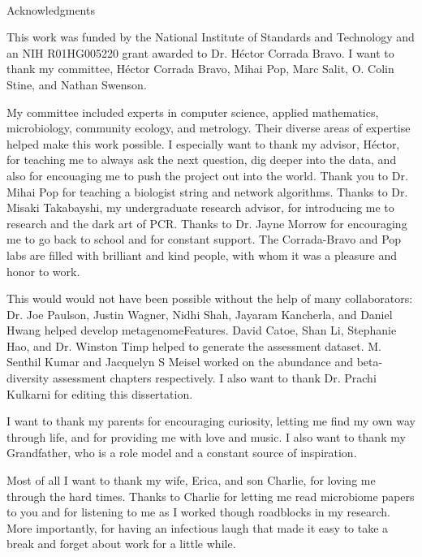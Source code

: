 
\renewcommand{\baselinestretch}{2}
\small\normalsize
\hbox{\ }

\vspace{-.65in}

\begin{center}
\large{Acknowledgments}
\end{center}

\vspace{1ex}


This work was funded by the National Institute of Standards and Technology and an NIH R01HG005220 grant awarded to Dr. Héctor Corrada Bravo.
I want to thank my committee, Héctor Corrada Bravo, Mihai Pop, Marc Salit, O. Colin Stine, and Nathan Swenson.  

My committee included experts in computer science, applied mathematics, microbiology, community ecology, and metrology.
Their diverse areas of expertise helped make this work possible.
I especially want to thank my advisor, Héctor, for teaching me to always ask the next question, dig deeper into the data, and also for encouaging me to push the project out into the world. 
Thank you to Dr. Mihai Pop for teaching a biologist string and network algorithms. 
Thanks to Dr. Misaki Takabayshi, my undergraduate research advisor, for introducing me to research and the dark art of PCR.
Thanks to Dr. Jayne Morrow for encouraging me to go back to school and for constant support.
The Corrada-Bravo and Pop labs are filled with brilliant and kind people, with whom it was a pleasure and honor to work.  

This would would not have been possible without the help of many collaborators: 
Dr. Joe Paulson, Justin Wagner, Nidhi Shah, Jayaram Kancherla, and Daniel Hwang helped develop metagenomeFeatures. 
David Catoe, Shan Li, Stephanie Hao, and Dr. Winston Timp helped to generate the assessment dataset.
M. Senthil Kumar and Jacquelyn S Meisel worked on the abundance and beta-diversity assessment chapters respectively. 
I also want to thank Dr. Prachi Kulkarni for editing this dissertation.  

I want to thank my parents for encouraging curiosity, letting me find my own way through life, and for providing me with love and music.
I also want to thank my Grandfather, who is a role model and a constant source of inspiration. 

Most of all I want to thank my wife, Erica, and son Charlie, for loving me through the hard times.
Thanks to Charlie for letting me read microbiome papers to you and for listening to me as I worked though roadblocks in my research.
More importantly, for having an infectious laugh that made it easy to take a break and forget about work for a little while.

